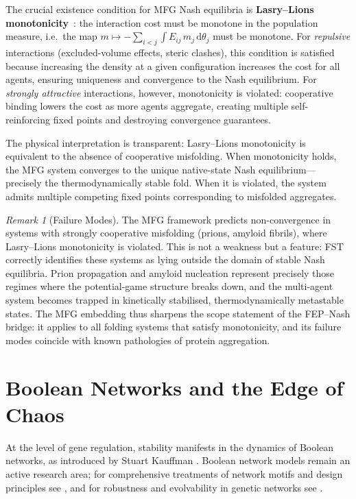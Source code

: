 \documentclass[12pt,a4paper]{article}
\theoremstyle{remark}
\newtheorem{remark}{Remark}
\begin{document}
The crucial existence condition for MFG Nash equilibria is \textbf{Lasry--Lions monotonicity}~\cite{LasryLions2007}: the interaction cost must be monotone in the population measure, i.e.\ the map $m\mapsto -\sum_{i<j}\int E_{ij}\,m_j\,\mathrm{d}\theta_j$ must be monotone. For \emph{repulsive} interactions (excluded-volume effects, steric clashes), this condition is satisfied because increasing the density at a given configuration increases the cost for all agents, ensuring uniqueness and convergence to the Nash equilibrium. For \emph{strongly attractive} interactions, however, monotonicity is violated: cooperative binding lowers the cost as more agents aggregate, creating multiple self-reinforcing fixed points and destroying convergence guarantees.

The physical interpretation is transparent: Lasry--Lions monotonicity is equivalent to the absence of cooperative misfolding. When monotonicity holds, the MFG system converges to the unique native-state Nash equilibrium---precisely the thermodynamically stable fold. When it is violated, the system admits multiple competing fixed points corresponding to misfolded aggregates.

\begin{remark}[Failure Modes]\label{rem:mfg-failure}
The MFG framework predicts non-convergence in systems with strongly cooperative misfolding (prions, amyloid fibrils), where Lasry--Lions monotonicity is violated. This is not a weakness but a feature: FST correctly identifies these systems as lying outside the domain of stable Nash equilibria. Prion propagation and amyloid nucleation represent precisely those regimes where the potential-game structure breaks down, and the multi-agent system becomes trapped in kinetically stabilised, thermodynamically metastable states. The MFG embedding thus sharpens the scope statement of the FEP--Nash bridge: it applies to all folding systems that satisfy monotonicity, and its failure modes coincide with known pathologies of protein aggregation.
\end{remark}

\section{Boolean Networks and the Edge of Chaos}
\label{sec:boolean}

At the level of gene regulation, stability manifests in the dynamics of Boolean networks, as introduced by Stuart Kauffman \citep{BooleanPost,KauffmanOrigins}. Boolean network models remain an active research area; for comprehensive treatments of network motifs and design principles see \citet{AlonSystems2007}, and for robustness and evolvability in genetic networks see \citet{WagnerRobustness2005}.
\end{document}
